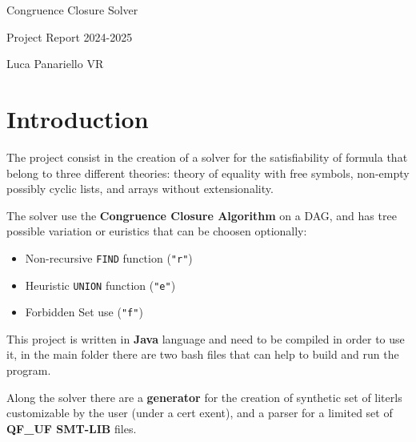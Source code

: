 \documentclass[11pt,a4paper]{article}
\begin{document}
    
    \begin{center}
        \Huge Congruence Closure Solver

        \LARGE Project Report 2024-2025

        \Large {Luca Panariello VR}
    \end{center}

    \vspace{0.5em}

    \section{Introduction}

    The project consist in the creation of a solver for the satisfiability 
    of formula that belong to three different theories: theory of equality with free symbols, 
    non-empty possibly cyclic lists, and arrays without extensionality.

    The solver use the \textbf{Congruence Closure Algorithm} on a DAG, and has tree possible 
    variation or euristics that can be choosen optionally:
    \begin{itemize}
        \item Non-recursive \texttt{FIND} function (\texttt{"r"})
        \item Heuristic \texttt{UNION} function (\texttt{"e"})
        \item Forbidden Set use (\texttt{"f"})
    \end{itemize}

    This project is written in \textbf{Java} language and need to be compiled in order to use it, 
    in the main folder there are two bash files that can help to build and run the program.

    Along the solver there are a \textbf{generator} for the creation of synthetic 
    set of literls customizable by the user (under a cert exent), and a 
    parser for a limited set of \textbf{QF\_UF SMT-LIB} files.
\end{document}
